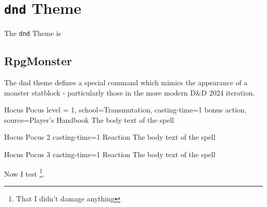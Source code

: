 \chapter{\texttt{dnd} Theme}

	The \texttt{dnd} Theme is 

	\section{RpgMonster}

		The dnd theme defines a special command which mimics the appearance of a monster statblock - particularly those in the more modern D\&D 2024 iteration. 

			


	\begin{RpgSpell}{Hocus Pocus}{
		level = 1,
		school=Transmutation,
		casting-time={1 bonus action},
		source={Player's Handbook}
	}
		The body text of the spell

	\end{RpgSpell}

	\begin{RpgSpell}[]{Hocus Pocus 2}{
		casting-time={1 Reaction}
	}
		The body text of the \cardbreak spell
	\end{RpgSpell}
	
	\begin{RpgSpell}[width=8cm,under-img=\RpgPackagePath/themes/dnd/img/paper]{Hocus Pocus 3}{
		casting-time={1 Reaction}
	}
		The body text of the \cardbreak spell
	\end{RpgSpell}

	Now I test \footnote{That I didn't damage anything}.







	
